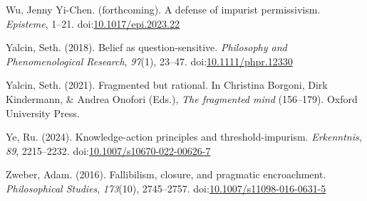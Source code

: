 \documentclass[
  10pt,
  letterpaper,
  twoside]{scrbook}
\newlength{\cslhangindent}
\newenvironment{CSLReferences}[2] %
 {\begin{list}{}{%
  \setlength{\itemindent}{0pt}
  \setlength{\leftmargin}{0pt}
  \setlength{\parsep}{0pt}
  \ifodd #1
   \setlength{\leftmargin}{\cslhangindent}
   \setlength{\itemindent}{-1\cslhangindent}
  \fi
  \setlength{\itemsep}{#2\baselineskip}}}
 {\end{list}}
\begin{document}
\begin{CSLReferences}{1}{0}
Wu, Jenny Yi-Chen. (forthcoming). A defense of impurist permissivism.
\emph{Episteme}, 1--21.
doi:\href{https://doi.org/10.1017/epi.2023.22}{10.1017/epi.2023.22}

Yalcin, Seth. (2018). Belief as question-sensitive. \emph{Philosophy and
Phenomenological Research}, \emph{97}(1), 23--47.
doi:\href{https://doi.org/10.1111/phpr.12330}{10.1111/phpr.12330}

Yalcin, Seth. (2021). Fragmented but rational. In Christina Borgoni,
Dirk Kindermann, \& Andrea Onofori (Eds.), \emph{The fragmented mind}
(156--179). Oxford University Press.

Ye, Ru. (2024). Knowledge-action principles and threshold-impurism.
\emph{Erkenntnis}, \emph{89}, 2215--2232.
doi:\href{https://doi.org/10.1007/s10670-022-00626-7}{10.1007/s10670-022-00626-7}

Zweber, Adam. (2016). Fallibilism, closure, and pragmatic encroachment.
\emph{Philosophical Studies}, \emph{173}(10), 2745--2757.
doi:\href{https://doi.org/10.1007/s11098-016-0631-5}{10.1007/s11098-016-0631-5}

\end{CSLReferences}


\backmatter
\end{document}
